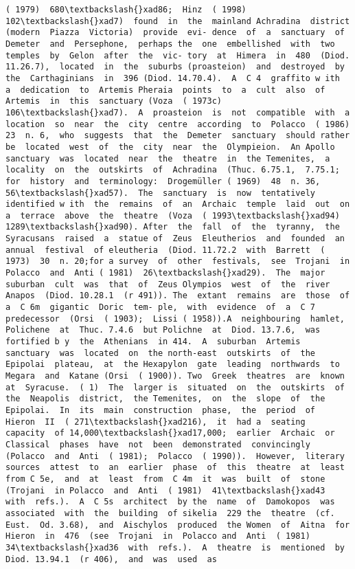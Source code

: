 \documentclass[11pt]{article}
\begin{document}
\begin{Verbatim}[commandchars=\\\{\}]
( 1979)  680\textbackslash{}xad86;  Hinz  ( 1998)  102\textbackslash{}xad7)  found  in  the  mainland Achradina  district  (modern  Piazza  Victoria)  provide  evi- dence  of  a  sanctuary  of  Demeter  and  Persephone,  perhaps the  one  embellished  with  two  temples  by  Gelon  after  the  vic- tory  at  Himera  in  480  (Diod. 11.26.7),  located  in  the  suburbs (proasteion)  and  destroyed  by  the  Carthaginians  in  396 (Diod. 14.70.4).  A  C 4  graffito w ith  a  dedication  to  Artemis Pheraia  points  to  a  cult  also  of  Artemis  in  this  sanctuary (Voza  ( 1973c)  106\textbackslash{}xad7).  A  proasteion  is  not  compatible  with  a location  so  near  the  city  centre  according  to  Polacco  ( 1986) 23  n. 6,  who  suggests  that  the  Demeter  sanctuary  should rather  be  located  west  of  the  city  near  the  Olympieion.  An Apollo  sanctuary  was  located  near  the  theatre  in  the Temenites,  a  locality  on  the  outskirts  of  Achradina  (Thuc. 6.75.1,  7.75.1;  for  history  and  terminology:  Drogemüller ( 1969)  48  n. 36,  56\textbackslash{}xad57).  The  sanctuary  is  now  tentatively identified w ith  the  remains  of  an  Archaic  temple  laid  out  on a  terrace  above  the  theatre  (Voza  ( 1993\textbackslash{}xad94)  1289\textbackslash{}xad90). After  the  fall  of  the  tyranny,  the  Syracusans  raised  a  statue of  Zeus  Eleutherios  and  founded  an  annual  festival  of eleutheria  (Diod. 11.72.2  with  Barrett  ( 1973)  30  n. 20;for a survey  of  other  festivals,  see  Trojani  in  Polacco  and  Anti ( 1981)  26\textbackslash{}xad29).  The  major  suburban  cult  was  that  of  Zeus Olympios  west  of  the  river  Anapos  (Diod. 10.28.1  (r 491)). The  extant  remains  are  those  of  a  C 6m  gigantic  Doric  tem- ple,  with  evidence  of  a  C 7  predecessor  (Orsi  ( 1903);  Lissi ( 1958)).A  neighbouring  hamlet,  Polichene  at  Thuc. 7.4.6  but Polichne  at  Diod. 13.7.6,  was  fortified b y  the  Athenians  in 414.  A  suburban  Artemis  sanctuary  was  located  on  the north-east  outskirts  of  the  Epipolai  plateau,  at  the Hexapylon  gate  leading  northwards  to  Megara  and  Katane (Orsi  ( 1900)). Two  Greek  theatres  are  known  at  Syracuse.  ( 1)  The  larger is  situated  on  the  outskirts  of  the  Neapolis  district,  the Temenites,  on  the  slope  of  the  Epipolai.  In  its  main  construction  phase,  the  period  of  Hieron  II  ( 271\textbackslash{}xad216),  it  had a  seating  capacity  of 14,000\textbackslash{}xad17,000;  earlier  Archaic  or Classical  phases  have  not  been  demonstrated  convincingly (Polacco  and  Anti  ( 1981);  Polacco  ( 1990)).  However,  literary sources  attest  to  an  earlier  phase  of  this  theatre  at  least  from C 5e,  and  at  least  from  C 4m  it  was  built  of  stone  (Trojani  in Polacco  and  Anti  ( 1981)  41\textbackslash{}xad43  with  refs.).  A  C 5s  architect  by the  name  of  Damokopos  was  associated  with  the  building  of sikelia  229 the  theatre  (cf.  Eust.  Od. 3.68),  and  Aischylos  produced  the Women  of  Aitna  for  Hieron  in  476  (see  Trojani  in  Polacco and  Anti  ( 1981)  34\textbackslash{}xad36  with  refs.).  A  theatre  is  mentioned  by Diod. 13.94.1  (r 406),  and  was  used  as  
\end{Verbatim}
\end{document}
